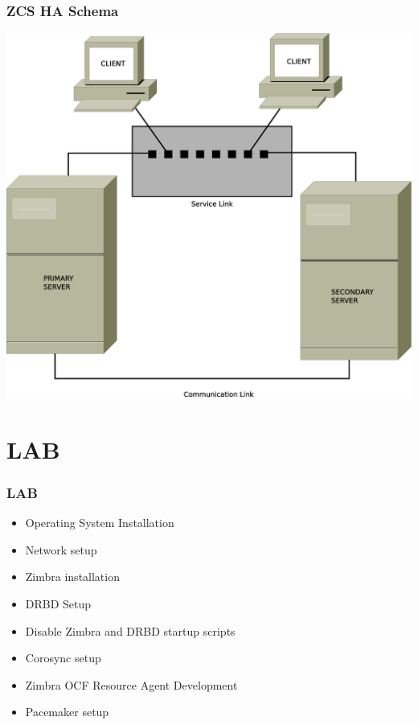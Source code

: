 \documentclass[10pt]{beamer}
\begin{document}
\begin{frame}
\frametitle{ZCS HA Schema}

\begin{center}
  \includegraphics[scale=0.19,keepaspectratio=true]{./img/ha_main_schema.eps}
\end{center}


\end{frame}

\section {LAB}

\begin{frame}
\frametitle{LAB}

\begin{itemize}

\item  {Operating System Installation}
\item  {Network setup}
\item  {Zimbra installation}
\item  {DRBD Setup}
\item  {Disable Zimbra and DRBD startup scripts}
\item  {Corosync setup}
\item  {Zimbra OCF Resource Agent Development}
\item  {Pacemaker setup}

\end{itemize}
\end{frame}
\end{document}
